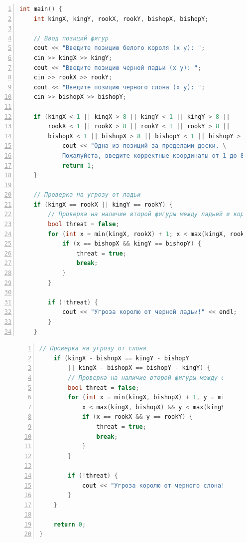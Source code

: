 \documentclass{article}
\begin{document}
\begin{center}
\begin{lstlisting}[language=C++, caption=Решение на C++ (часть 1), numbers=left,frame=single, keywordstyle=\color{blue},commentstyle=\color{green}, stringstyle=\color{red}, showstringspaces=false, breaklines=true, linewidth=\linewidth,]
int main() {
    int kingX, kingY, rookX, rookY, bishopX, bishopY;

    // Ввод позиций фигур
    cout << "Введите позицию белого короля (x y): ";
    cin >> kingX >> kingY;
    cout << "Введите позицию черной ладьи (x y): ";
    cin >> rookX >> rookY;
    cout << "Введите позицию черного слона (x y): ";
    cin >> bishopX >> bishopY;

    if (kingX < 1 || kingX > 8 || kingY < 1 || kingY > 8 || 
        rookX < 1 || rookX > 8 || rookY < 1 || rookY > 8 || 
        bishopX < 1 || bishopX > 8 || bishopY < 1 || bishopY > 8) {
            cout << "Одна из позиций за пределами доски. \
            Пожалуйста, введите корректные координаты от 1 до 8." << endl;
            return 1;
    }

    // Проверка на угрозу от ладьи
    if (kingX == rookX || kingY == rookY) {
        // Проверка на наличие второй фигуры между ладьей и королем
        bool threat = false;
        for (int x = min(kingX, rookX) + 1; x < max(kingX, rookX); x++) {
            if (x == bishopX && kingY == bishopY) {
                threat = true;
                break;
            }
        }

        if (!threat) {
            cout << "Угроза королю от черной ладьи!" << endl;
        }
    }
\end{lstlisting}
\end{center}
\begin{figure}[H]
\begin{lstlisting}[language=C++, caption=Решение на C++ (часть 2), numbers=left,frame=single, keywordstyle=\color{blue},commentstyle=\color{green}, stringstyle=\color{red}, showstringspaces=false, breaklines=true, linewidth=\linewidth,]
    // Проверка на угрозу от слона
    if (kingX - bishopX == kingY - bishopY 
    	|| kingX - bishopX == bishopY - kingY) {
        // Проверка на наличие второй фигуры между слоном и королем
        bool threat = false;
        for (int x = min(kingX, bishopX) + 1, y = min(kingY, bishopY) + 1; 
            x < max(kingX, bishopX) && y < max(kingY, bishopY); x++, y++) {
            if (x == rookX && y == rookY) {
                threat = true;
                break;
            }
        }

        if (!threat) {
            cout << "Угроза королю от черного слона!" << endl;
        }
    }

    return 0;
}
\end{lstlisting}
\end{figure}
\end{document}
